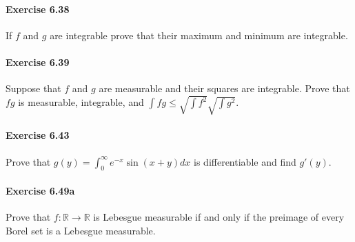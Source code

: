 \documentclass{article}
\begin{document}
\paragraph{Exercise 6.38} If $f$ and $g$ are integrable prove that their maximum and minimum are integrable.

\paragraph{Exercise 6.39} Suppose that $f$ and $g$ are measurable and their squares are integrable. Prove that $fg$ is measurable, integrable, and $\int fg \leq \sqrt{\int f^2} \sqrt{\int g^2}$.

\paragraph{Exercise 6.43} Prove that $g(y) = \int_0^\infty e^{-x} \sin(x + y) dx$ is differentiable and find $g'(y)$.

\paragraph{Exercise 6.49a} Prove that $f \colon \mathbb{R} \rightarrow \mathbb{R}$ is Lebesgue measurable if and only if the preimage of every Borel set is a Lebesgue measurable.
\end{document}
